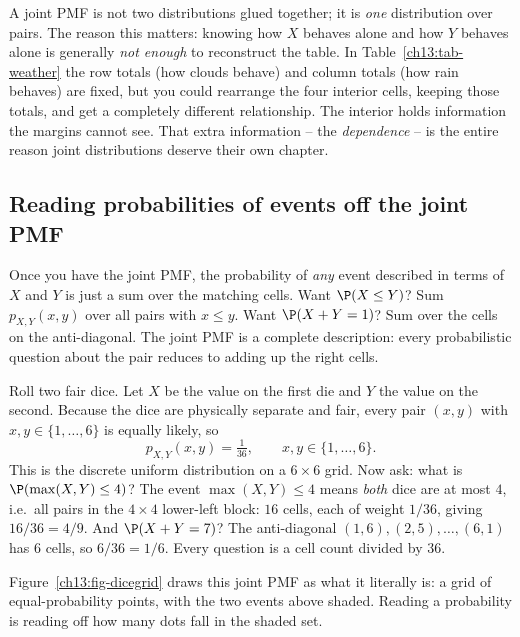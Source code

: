 \begin{happeningbox}
A joint PMF is not two distributions glued together; it is \emph{one}
distribution over pairs. The reason this matters: knowing how $X$ behaves alone
and how $Y$ behaves alone is generally \emph{not enough} to reconstruct the
table. In Table~\ref{ch13:tab-weather} the row totals (how clouds behave) and
column totals (how rain behaves) are fixed, but you could rearrange the four
interior cells, keeping those totals, and get a completely different
relationship. The interior holds information the margins cannot see. That extra
information -- the \emph{dependence} -- is the entire reason joint distributions
deserve their own chapter.
\end{happeningbox}

\subsection{Reading probabilities of events off the joint PMF}

Once you have the joint PMF, the probability of \emph{any} event described in
terms of $X$ and $Y$ is just a sum over the matching cells. Want
$\P(X \le Y)$? Sum $p_{X,Y}(x,y)$ over all pairs with $x\le y$. Want
$\P(X+Y = 1)$? Sum over the cells on the anti-diagonal. The joint PMF is a
complete description: every probabilistic question about the pair reduces to
adding up the right cells.

\begin{example}
\label{ch13:ex-twodice}
Roll two fair dice. Let $X$ be the value on the first die and $Y$ the value on
the second. Because the dice are physically separate and fair, every pair
$(x,y)$ with $x,y\in\{1,\dots,6\}$ is equally likely, so
\[
  p_{X,Y}(x,y) = \tfrac{1}{36}, \qquad x,y \in \{1,\dots,6\}.
\]
This is the discrete uniform distribution on a $6\times 6$ grid. Now ask: what is
$\P(\max(X,Y) \le 4)$? The event $\max(X,Y)\le 4$ means \emph{both} dice are at
most $4$, i.e.\ all pairs in the $4\times4$ lower-left block: $16$ cells, each of
weight $1/36$, giving $16/36 = 4/9$. And $\P(X+Y=7)$? The anti-diagonal
$(1,6),(2,5),\dots,(6,1)$ has $6$ cells, so $6/36 = 1/6$. Every question is a
cell count divided by $36$.
\end{example}

Figure~\ref{ch13:fig-dicegrid} draws this joint PMF as what it literally is: a
grid of equal-probability points, with the two events above shaded. Reading a
probability is reading off how many dots fall in the shaded set.

